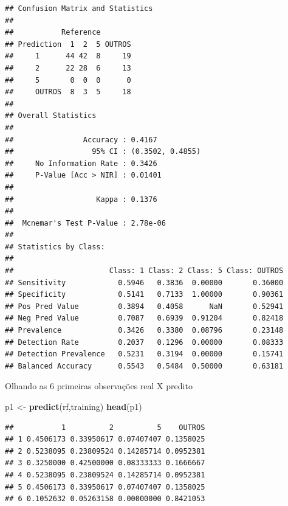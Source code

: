 \documentclass[]{article}
\newenvironment{Shaded}{\begin{snugshade}}{\end{snugshade}}
\newcommand{\KeywordTok}[1]{\textcolor[rgb]{0.13,0.29,0.53}{\textbf{#1}}}
\newcommand{\NormalTok}[1]{#1}
\newcommand{\OperatorTok}[1]{\textcolor[rgb]{0.81,0.36,0.00}{\textbf{#1}}}
\newcommand{\StringTok}[1]{\textcolor[rgb]{0.31,0.60,0.02}{#1}}
\begin{document}
\begin{verbatim}
## Confusion Matrix and Statistics
## 
##           Reference
## Prediction  1  2  5 OUTROS
##     1      44 42  8     19
##     2      22 28  6     13
##     5       0  0  0      0
##     OUTROS  8  3  5     18
## 
## Overall Statistics
##                                           
##                Accuracy : 0.4167          
##                  95% CI : (0.3502, 0.4855)
##     No Information Rate : 0.3426          
##     P-Value [Acc > NIR] : 0.01401         
##                                           
##                   Kappa : 0.1376          
##                                           
##  Mcnemar's Test P-Value : 2.78e-06        
## 
## Statistics by Class:
## 
##                      Class: 1 Class: 2 Class: 5 Class: OUTROS
## Sensitivity            0.5946   0.3836  0.00000       0.36000
## Specificity            0.5141   0.7133  1.00000       0.90361
## Pos Pred Value         0.3894   0.4058      NaN       0.52941
## Neg Pred Value         0.7087   0.6939  0.91204       0.82418
## Prevalence             0.3426   0.3380  0.08796       0.23148
## Detection Rate         0.2037   0.1296  0.00000       0.08333
## Detection Prevalence   0.5231   0.3194  0.00000       0.15741
## Balanced Accuracy      0.5543   0.5484  0.50000       0.63181
\end{verbatim}

Olhando as 6 primeiras observações real X predito

\begin{Shaded}
\begin{Highlighting}[]
\NormalTok{p1 <-}\StringTok{ }\KeywordTok{predict}\NormalTok{(rf,training)}
\KeywordTok{head}\NormalTok{(p1)}
\end{Highlighting}
\end{Shaded}

\begin{verbatim}
##           1          2          5    OUTROS
## 1 0.4506173 0.33950617 0.07407407 0.1358025
## 2 0.5238095 0.23809524 0.14285714 0.0952381
## 3 0.3250000 0.42500000 0.08333333 0.1666667
## 4 0.5238095 0.23809524 0.14285714 0.0952381
## 5 0.4506173 0.33950617 0.07407407 0.1358025
## 6 0.1052632 0.05263158 0.00000000 0.8421053
\end{verbatim}

\begin{Shaded}
\end{Shaded}
\end{document}
